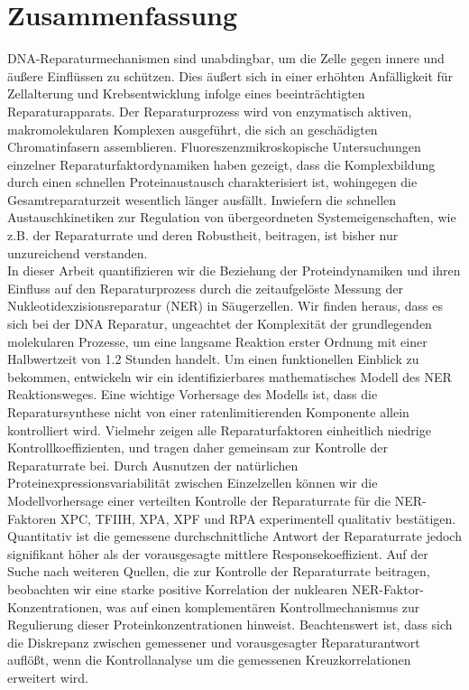 \chapter*{Zusammenfassung}
\thispagestyle{plain2}


DNA-Reparaturmechanismen sind unabdingbar, um die Zelle gegen innere und \"{a}u\ss{}ere Einfl\"{u}ssen zu sch\"{u}tzen. Dies \"{a}u\ss{}ert sich in einer erh\"{o}hten Anf\"{a}lligkeit f\"{u}r Zellalterung und Krebsentwicklung infolge eines beeintr\"{a}chtigten Reparaturapparats. Der Reparaturprozess wird von enzymatisch aktiven, makromolekularen Komplexen ausgef\"{u}hrt, die sich an gesch\"{a}digten Chromatinfasern assemblieren. Fluoreszenzmikroskopische Untersuchung\-en einzelner Reparaturfaktordynamiken haben gezeigt, dass die Komplexbildung durch einen schnellen Proteinaustausch charakterisiert ist, wohingegen die Gesamtreparaturzeit wesentlich l\"{a}nger ausf\"{a}llt. Inwiefern die schnellen Austauschkinetiken zur Regulation von \"{u}bergeordneten Systemeigenschaften, wie z.B. der Reparaturrate und deren Robustheit, beitragen, ist bisher nur unzureichend verstanden.\\
In dieser Arbeit quantifizieren wir die Beziehung der Proteindynamiken und ihren Einfluss auf den Reparaturprozess durch die zeitaufgel\"{o}ste Messung der Nukleotidexzisionsreparatur (NER) in S\"{a}ugerzellen. Wir finden heraus, dass es sich bei der DNA Reparatur, ungeachtet der Komplexit\"{a}t der grundlegenden molekularen Prozesse, um eine langsame Reaktion erster Ordnung mit einer Halb\-wertzeit von 1.2 Stunden handelt. 
Um einen funktionellen Einblick zu bekommen, entwickeln wir ein identifizierbares ma\-the\-matisches Modell des NER Reaktionsweges. Eine wichtige Vorhersage des Modells ist, dass die Reparatursynthese nicht von einer ratenlimitierenden Komponente allein kontrolliert wird. Vielmehr zeigen alle Reparaturfaktoren einheitlich niedrige Kontrollkoeffizienten, und tragen daher gemeinsam zur Kontrolle der Reparaturrate bei. Durch Ausnutzen der nat\"{u}rlichen Proteinexpressionsvariabilit\"{a}t zwischen Einzelzellen k\"{o}nnen wir die Modell\-vorhersage einer verteilten Kontrolle der Reparaturrate f\"{u}r die NER-Faktoren XPC, TFIIH, XPA, XPF und RPA experimentell qualitativ best\"{a}tigen. Quantitativ ist die gemessene durchschnittliche Antwort der Reparaturrate jedoch signifikant h\"{o}her als der vorausgesagte mittlere Responsekoeffizient. Auf der Suche nach weiteren Quellen, die zur Kontrolle der Reparaturrate beitragen, beobachten wir eine starke positive Korrelation der nu\-klearen NER-Faktor-Konzentrationen, was auf einen komplement\"{a}ren Kontrollmechanismus zur Regulierung dieser Proteinkonzentrationen hinweist. Beachtenswert ist, dass sich die Diskrepanz zwischen gemessener und vorausgesagter Reparaturantwort aufl\"{o}\ss{}t, wenn die Kontrollanalyse um die gemessenen Kreuzkorrelationen erweitert wird.\\              
